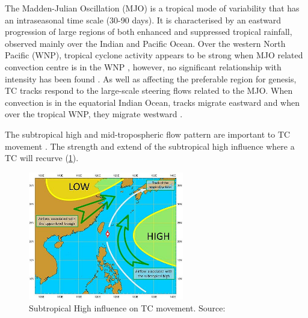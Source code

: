 The Madden-Julian Oscillation (MJO) is a tropical mode of variability that has an intraseasonal time scale (30-90 days). It is characterised by an eastward progression of large regions of both enhanced and suppressed tropical rainfall, observed mainly over the Indian and Pacific Ocean. Over the western North Pacific (WNP), tropical cyclone activity appears to be strong when MJO related convection centre is in the WNP \citep{kim2008systematic}, however, no significant relationship with intensity has been found \citep{liebmann1994relationship}. As well as affecting the preferable region for genesis, TC tracks respond to the large-scale steering flows related to the MJO. When convection is in the equatorial Indian Ocean, tracks migrate eastward and when over the tropical WNP, they migrate westward \citep{kim2008systematic}.




The subtropical high and mid-tropospheric flow pattern are important to TC movement \citep{chan1982tropical}. The strength and extend of the subtropical high influence where a TC will recurve (\ref{fig:STH}). %

\begin{figure}[h]
	\centering
	\noindent\includegraphics[width=16pc,angle=0]{typhoon16_1e.jpg}
	\caption{Subtropical High influence on TC movement. Source: }\label{fig:STH}
\end{figure}

